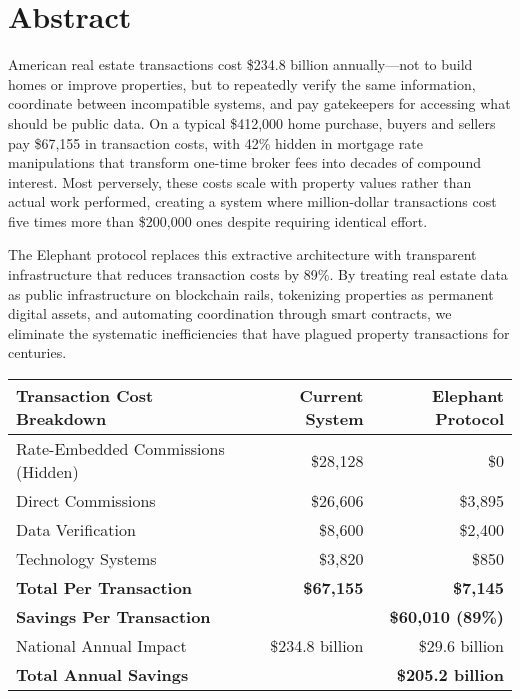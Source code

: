 \chapter{Abstract}

American real estate transactions cost \$234.8 billion annually—not to build homes or improve properties, but to repeatedly verify the same information, coordinate between incompatible systems, and pay gatekeepers for accessing what should be public data. On a typical \$412,000 home purchase, buyers and sellers pay \$67,155 in transaction costs, with 42\% hidden in mortgage rate manipulations that transform one-time broker fees into decades of compound interest. Most perversely, these costs scale with property values rather than actual work performed, creating a system where million-dollar transactions cost five times more than \$200,000 ones despite requiring identical effort.

The Elephant protocol replaces this extractive architecture with transparent infrastructure that reduces transaction costs by 89\%. By treating real estate data as public infrastructure on blockchain rails, tokenizing properties as permanent digital assets, and automating coordination through smart contracts, we eliminate the systematic inefficiencies that have plagued property transactions for centuries.

\begin{table}[h]
\centering
\begin{tabular}{lrr}
\hline
\textbf{Transaction Cost Breakdown} & \textbf{Current System} & \textbf{Elephant Protocol} \\
\hline
Rate-Embedded Commissions (Hidden) & \$28,128 & \$0 \\
Direct Commissions & \$26,606 & \$3,895 \\
Data Verification & \$8,600 & \$2,400 \\
Technology Systems & \$3,820 & \$850 \\
\hline
\textbf{Total Per Transaction} & \textbf{\$67,155} & \textbf{\$7,145} \\
\textbf{Savings Per Transaction} & & \textbf{\$60,010 (89\%)} \\
\hline
National Annual Impact & \$234.8 billion & \$29.6 billion \\
\textbf{Total Annual Savings} & & \textbf{\$205.2 billion} \\
\hline
\end{tabular}
\end{table}

